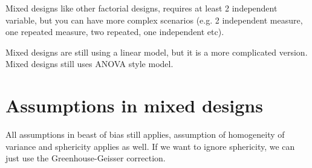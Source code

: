 Mixed designs like other factorial designs, requires at least 2 independent variable, but you can have more complex scenarios (e.g. 2 independent measure, one repeated measure, two repeated, one independent etc).

Mixed designs are still using a linear model, but it is a more complicated version. 
Mixed designs still uses ANOVA style model. 

\section{Assumptions in mixed designs}
All assumptions in beast of bias still applies, assumption of homogeneity of variance and sphericity applies as well. If we want to ignore sphericity, we can just use the Greenhouse-Geisser correction. 
